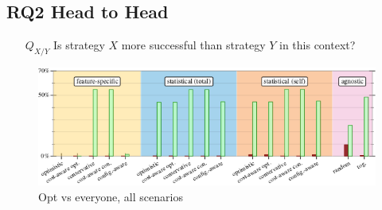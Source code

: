 \subsection{RQ2 Head to Head}

\begin{itemize}
\item[$Q_{X/Y}$] Is strategy $X$ more successful than strategy $Y$ in this
  context?
\end{itemize}

\begin{figure}[t]
  \includegraphics[width=0.9\columnwidth]{data/head-to-head.pdf}
  \caption{Opt vs everyone, all scenarios}
  \label{f:head-to-head}
\end{figure}

\clearpage

